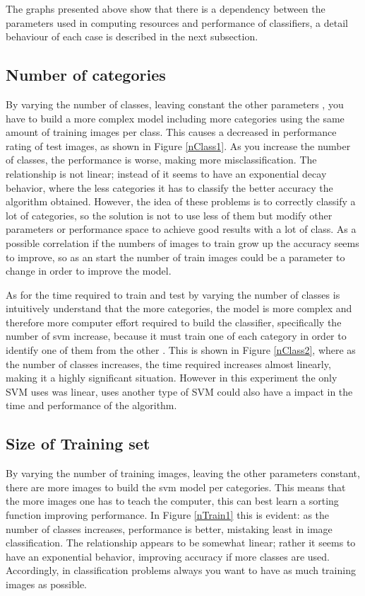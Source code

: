 \documentclass[10pt,twocolumn,letterpaper]{article}
\begin{document}
The graphs presented above show that there is a dependency between the parameters used in computing resources and performance of classifiers, a detail behaviour of each case is described in the next subsection.

\subsection{Number of categories}

By varying the number of classes, leaving constant the other parameters , you have to build a more complex model including more categories using the same amount of training images per class. This causes a decreased in performance rating of test images, as shown in Figure \ref{nClass1}. As you increase the number of classes, the performance is worse, making more misclassification. The relationship is not linear; instead of it seems to have an exponential decay behavior, where the less categories it has to classify the better accuracy the algorithm obtained. However, the idea of these problems is to correctly classify a lot of categories, so the solution is not to use less of them but modify other parameters or performance space to achieve good results with a lot of class. As a possible correlation if the numbers of images to train grow up the accuracy seems to improve, so as an start the number of train images could be a parameter to change in order to improve the model. 

As for the time required to train and test by varying the number of classes is intuitively understand that the more categories, the model is more complex and therefore more computer effort required to build the classifier, specifically the number of svm increase, because it must train one of each category in order to identify one of them from the other . This is shown in Figure \ref{nClass2}, where as the number of classes increases, the time required increases almost linearly, making it a highly significant situation. However in this experiment the only SVM uses was linear, uses another type of SVM could also have a impact in the time and performance of the algorithm.

\subsection{Size of Training set}

By varying the number of training images, leaving the other parameters constant, there are more images to build the svm model per categories. This means that the more images one has to teach the computer, this can best learn a sorting function improving performance. In Figure \ref{nTrain1} this is evident: as the number of classes increases, performance is better, mistaking least in image classification. The relationship appears to be somewhat linear; rather it seems to have an exponential behavior, improving accuracy if more classes are used. Accordingly, in classification problems always you want to have as much training images as possible.
\end{document}
